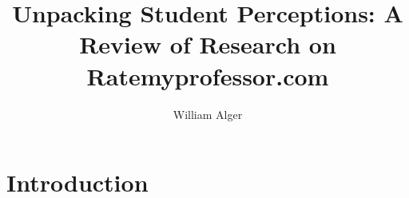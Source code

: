 \documentclass[man,12pt]{apa6}
\title{Unpacking Student Perceptions: A Review of Research on Ratemyprofessor.com}
\author{William Alger}
\affiliation{Northern Kentucky University}
\begin{document}
\maketitle

\section{Introduction}

\end{document}
